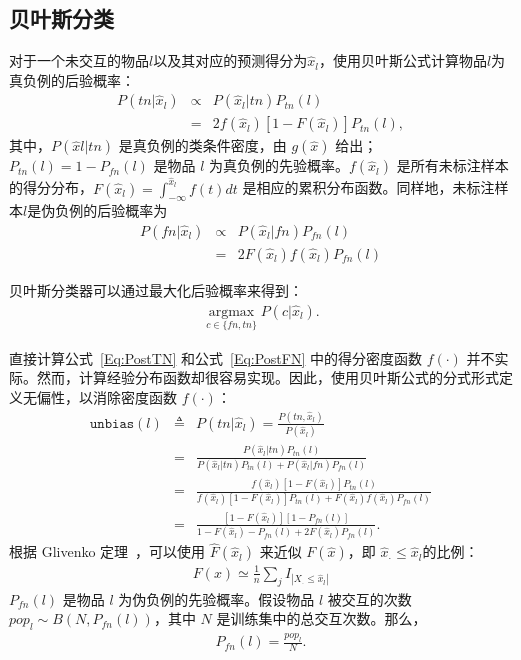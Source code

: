 \subsection{贝叶斯分类}
对于一个未交互的物品$l$以及其对应的预测得分为$\hat{x}_l$，使用贝叶斯公式计算物品$l$为真负例的后验概率：
\begin{eqnarray} \label{Eq:PostTN}
	P(tn|\hat{x}_l) &\propto& P(\hat{x}_l|tn) P_{tn}(l) \nonumber \\
	&=&  2f(\hat{x}_l) [1 - F(\hat{x}_l)] P_{tn}(l),
\end{eqnarray}
其中，$P(\hat{x}l|tn)$ 是真负例的类条件密度，由 $g(\hat{x})$ 给出；$P_{tn}(l) = 1 - P_{fn}(l)$ 是物品 $l$ 为真负例的先验概率。$f(\hat{x}_l)$ 是所有未标注样本的得分分布，$F(\hat{x}_l) = \int_{-\infty}^{\hat{x}_l} f(t) dt$ 是相应的累积分布函数。同样地，未标注样本$l$是伪负例的后验概率为
\begin{eqnarray}\label{Eq:PostFN}
	P(fn|\hat{x}_l) &\propto& P(\hat{x}_l|fn) P_{fn}(l) \nonumber \\
	&=& 2 F(\hat{x}_l) f(\hat{x}_l) P_{fn}(l)
\end{eqnarray}

贝叶斯分类器可以通过最大化后验概率来得到：
\begin{eqnarray}
	\mathop{\arg\max}\limits_{c \in \{fn, tn\}} P(c|\hat{x}_l).
\end{eqnarray}

直接计算公式~\eqref{Eq:PostTN} 和公式~\eqref{Eq:PostFN} 中的得分密度函数 $f(\cdot)$ 并不实际。然而，计算经验分布函数却很容易实现。因此，使用贝叶斯公式的分式形式定义无偏性，以消除密度函数 $f(\cdot)$：
\begin{eqnarray}
	\mathtt{unbias}(l) &\triangleq&  P(tn|\hat{x}_l) = \frac{P(tn,\hat{x}_l)}{P(\hat{x}_l)} \label{Eq:NorPost} \\
	&=& \frac{P(\hat{x}_l |tn)P_{tn}(l)}{P(\hat{x}_l |tn)P_{tn}(l)+P(\hat{x}_l |fn)P_{fn}(l)} \\
	&=& \frac{ f(\hat{x}_l) [1 - F(\hat{x}_l)] P_{tn}(l)}{ f(\hat{x}_l) [1 - F(\hat{x}_l)] P_{tn}(l) + F(\hat{x}_l) f(\hat{x}_l) P_{fn}(l) }  \nonumber\\
	&=&  \frac{  [1 - F(\hat{x}_l)][1-P_{fn}(l)] }{1 - F(\hat{x}_l) -P_{fn}(l) + 2F(\hat{x}_l)P_{fn}(l) }.\label{Eq:unbias}
\end{eqnarray}
根据 Glivenko 定理~\cite{glivenko:1933}，可以使用 $\hat F(\hat{x}_l)$ 来近似 $F(\hat{x})$，即 $\hat{x}_{\cdot} \leq \hat{x}_l$的比例：
\begin{eqnarray}\label{Eq:CDF}
 F(x) \simeq \frac{1}{n}\sum_j I_{|X_\cdot \leq \hat{x}_l|}
\end{eqnarray}
$P_{fn}(l)$ 是物品 $l$ 为伪负例的先验概率。假设物品 $l$ 被交互的次数 $pop_l \sim B(N, P_{fn}(l))$，其中 $N$ 是训练集中的总交互次数。那么，
\begin{eqnarray}\label{Eq:Prior}	
	P_{fn}(l) = \frac{pop_l}{N}.
\end{eqnarray}

